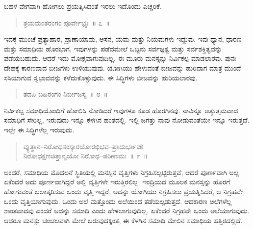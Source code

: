 \vspace{-0.2cm}


ಬಹಳ ವೇಗವಾಗಿ ಹೋಗಲು ಪ್ರಯತ್ನಿಸಿದಂತೆ ಇರಲು ಇದೊಂದು ಎಚ್ಚರಿಕೆ. 

\vspace{-0.3cm}

\begin{verse}
ತ್ರಯಮಂತರಂಗಂ ಪೂರ್ವೇಭ್ಯಃ~॥ ೭~॥
\end{verse}

\vspace{-0.3cm}


ಇದಕ್ಕೆ ಮುಂಚೆ ಪ್ರತ್ಯಾಹಾರ, ಪ್ರಾಣಾಯಾಮ, ಆಸನ, ಯಮ ಮತ್ತು ನಿಯಮಗಳು ಇದ್ದುವು. ಇವು ಧ್ಯಾನ, ಧಾರಣ ಮತ್ತು ಸಮಾಧಿಯ ಹೊರಭಾಗ. ಇವುಗಳನ್ನು ಪಡೆದಮೇಲೆ ಒಬ್ಬನು ಸರ್ವಜ್ಞತ್ವ ಮತ್ತು ಸರ್ವಶಕ್ತಿತ್ವವನ್ನು ಪಡೆಯಬಹುದು. ಆದರೆ ಇದು ಮೋಕ್ಷವಾಗುವುದಿಲ್ಲ. ಈ ಮೂರು ಮನಸ್ಸನ್ನು ನಿರ್ವಿಕಲ್ಪ ಮಾಡಲಾರವು. ಪುನಃ ದೇಹಕ್ಕೆ ಕಾರಣವಾದ ಬೀಜಗಳು ಉಳಿಯುವುವು. ಯೋಗಿಯು ಹೇಳುವಂತೆ ಬೀಜವನ್ನು ಹುರಿದಾಗ ಮಾತ್ರ ಮುಂದೆ ಸಸಿಯಾಗುವ ಸ್ವಭಾವವನ್ನು ಕಳೆದುಕೊಳ್ಳುವುದು. ಈ ಸಿದ್ಧಿಗಳು ಬೀಜವನ್ನು ಹುರಿಯಲಾರವು. 

\vspace{-0.3cm}

\begin{verse}
ತದಪಿ ಬಹಿರಂಗಂ ನಿರ್ಬೀಜಸ್ಯ~॥ ೮~॥
\end{verse}

\vspace{-0.3cm}


ನಿರ್ವಿಕಲ್ಪ ಸಮಾಧಿಯೊಂದಿಗೆ ಹೋಲಿಸಿ ನೋಡಿದರೆ ಇವುಗಳೂ ಕೂಡ ಹೊರಗಿನವು. ನಾವಿನ್ನೂ ಅತ್ಯುತ್ತಮವಾದ ಸಮಾಧಿಗೆ ಸೇರಿಲ್ಲ, ಇರುವುದು ಇನ್ನೂ ಕೆಳಗಿನ ಹಂತದಲ್ಲಿ. ಇಲ್ಲಿ ಜಗತ್ತು ನಾವು ನೋಡುವಂತೆಯೇ ಇನ್ನೂ ಇರುತ್ತದೆ. ಇಲ್ಲೇ ಈ ಸಿದ್ಧಿಗಳೆಲ್ಲ ಇರುವುದು. 

\vspace{-0.3cm}

\begin{verse}
ವ್ಯುತ್ಥಾನ–ನಿರೋಧಸಂಸ್ಕಾರಯೋರಭಿಭವ–ಪ್ರಾದುರ್ಭಾವೌ\\ನಿರೋಧಕ್ಷಣಚಿತ್ತಾನ್ವಯೋ ನಿರೋಧ–ಪರಿಣಾಮಃ~॥ ೯~॥
\end{verse}

\vspace{-0.3cm}


ಅಂದರೆ, ಸಮಾಧಿಯ ಮೊದಲನೆ ಸ್ಥಿತಿಯಲ್ಲಿ ಮನಸ್ಸಿನ ವೃತ್ತಿಗಳು ನಿಗ್ರಹಿಸಲ್ಪಟ್ಟಿರುತ್ತವೆ, ಆದರೆ ಪೂರ್ಣವಾಗಿ ಅಲ್ಲ. ಏಕೆಂದರೆ ಅದು ಪೂರ್ಣವಾಗಿದ್ದರೆ ಅಲ್ಲಿ ವೃತ್ತಿಗಳೇ ಇರುತ್ತಿರಲಿಲ್ಲ. ಇಂದ್ರಿಯದ ಮೂಲಕ ಮನಸ್ಸನ್ನು ಹೊರಗೆ ಹೋಗುವಂತೆ ಬಲಾತ್ಕರಿಸುವ ಒಂದು ವೃತ್ತಿ ಇದ್ದರೆ, ಅದನ್ನು ಯೋಗಿಯು ನಿಗ್ರಹಿಸಲು ಪ್ರಯತ್ನಿಸಿದರೆ, ಆ ನಿಗ್ರಹವೇ ಒಂದು ವೃತ್ತಿಯಾಗುವುದು. ಒಂದು ಅಲೆ ಮತ್ತೊಂದು ಅಲೆಯಿಂದ ತಡೆಯಲ್ಪಡುತ್ತದೆ. ಆದಕಾರಣ ಅಲೆಗಳೆಲ್ಲ ಶಾಂತವಾದವು ಎಂದರೆ ಅದನ್ನು ಸಮಾಧಿ ಎಂದು ಹೇಳಲಾಗುವುದಿಲ್ಲ. ಏಕೆಂದರೆ ನಿಗ್ರಹವೇ ಒಂದು ಅಲೆಯಾಗುವುದು. ಆದರೂ ಮನಸ್ಸು ಚಂಚಲವಾಗಿ ಮೇಲೆ ಬರುವುದಕ್ಕಿಂತ, ಈ ಕೆಳಗಿನ ಸಮಾಧಿ ಮೇಲಿನ ಸಮಾಧಿಯ ಹತ್ತಿರದಲ್ಲಿದೆ. 


